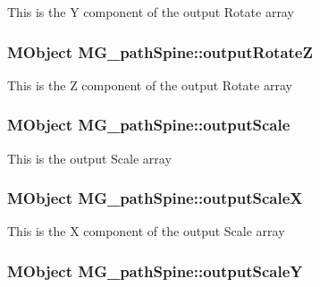 This is the Y component of the output Rotate array \hypertarget{class_m_g__path_spine_a7449fba41f2530d7fa797d392beeb0e0}{
\subsubsection[{output\-Rotate\-Z}]{\setlength{\rightskip}{0pt plus 5cm}M\-Object M\-G\-\_\-path\-Spine\-::output\-Rotate\-Z\hspace{0.3cm}{\ttfamily [static]}}}\label{class_m_g__path_spine_a7449fba41f2530d7fa797d392beeb0e0}
This is the Z component of the output Rotate array \hypertarget{class_m_g__path_spine_a3c6c85e54a0a8f98f067df5884006717}{
\subsubsection[{output\-Scale}]{\setlength{\rightskip}{0pt plus 5cm}M\-Object M\-G\-\_\-path\-Spine\-::output\-Scale\hspace{0.3cm}{\ttfamily [static]}}}\label{class_m_g__path_spine_a3c6c85e54a0a8f98f067df5884006717}
This is the output Scale array \hypertarget{class_m_g__path_spine_a34a92ba0bc42a34ff70602b136272a01}{
\subsubsection[{output\-Scale\-X}]{\setlength{\rightskip}{0pt plus 5cm}M\-Object M\-G\-\_\-path\-Spine\-::output\-Scale\-X\hspace{0.3cm}{\ttfamily [static]}}}\label{class_m_g__path_spine_a34a92ba0bc42a34ff70602b136272a01}
This is the X component of the output Scale array \hypertarget{class_m_g__path_spine_a5cbcb31bcb281e841905b6ec643ce5bc}{
\subsubsection[{output\-Scale\-Y}]{\setlength{\rightskip}{0pt plus 5cm}M\-Object M\-G\-\_\-path\-Spine\-::output\-Scale\-Y\hspace{0.3cm}{\ttfamily [static]}}}\label{class_m_g__path_spine_a5cbcb31bcb281e841905b6ec643ce5bc}
